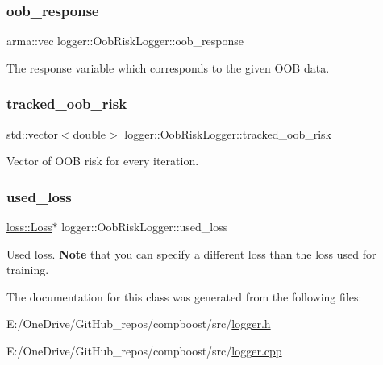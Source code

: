 \subsubsection{\texorpdfstring{oob\+\_\+response}{oob\_response}}
{\footnotesize\ttfamily arma\+::vec logger\+::\+Oob\+Risk\+Logger\+::oob\+\_\+response\hspace{0.3cm}{\ttfamily [private]}}



The response variable which corresponds to the given O\+OB data. 

\mbox{\label{classlogger_1_1_oob_risk_logger_a00a9435107588888c891c88aead67159}} 
\subsubsection{\texorpdfstring{tracked\+\_\+oob\+\_\+risk}{tracked\_oob\_risk}}
{\footnotesize\ttfamily std\+::vector$<$double$>$ logger\+::\+Oob\+Risk\+Logger\+::tracked\+\_\+oob\+\_\+risk\hspace{0.3cm}{\ttfamily [private]}}



Vector of O\+OB risk for every iteration. 

\mbox{\label{classlogger_1_1_oob_risk_logger_a40d02b9eec15e823bb2d71cf2112d6ed}} 
\subsubsection{\texorpdfstring{used\+\_\+loss}{used\_loss}}
{\footnotesize\ttfamily \mbox{\hyperlink{classloss_1_1_loss}{loss\+::\+Loss}}$\ast$ logger\+::\+Oob\+Risk\+Logger\+::used\+\_\+loss\hspace{0.3cm}{\ttfamily [private]}}



Used loss. {\bfseries Note} that you can specify a different loss than the loss used for training. 



The documentation for this class was generated from the following files\+:\begin{DoxyCompactItemize}
\item 
E\+:/\+One\+Drive/\+Git\+Hub\+\_\+repos/compboost/src/\mbox{\hyperlink{logger_8h}{logger.\+h}}\item 
E\+:/\+One\+Drive/\+Git\+Hub\+\_\+repos/compboost/src/\mbox{\hyperlink{logger_8cpp}{logger.\+cpp}}\end{DoxyCompactItemize}
